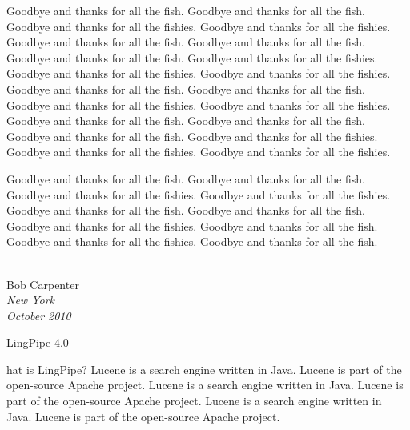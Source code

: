 \documentclass[11pt]{book}
\begin{document}
Goodbye and thanks for all the fish.
Goodbye and thanks for all the fish.
Goodbye and thanks for all the fishies.
Goodbye and thanks for all the fishies.
Goodbye and thanks for all the fish.
Goodbye and thanks for all the fish.
Goodbye and thanks for all the fish.
Goodbye and thanks for all the fishies.
Goodbye and thanks for all the fishies.
Goodbye and thanks for all the fishies.
Goodbye and thanks for all the fish.
Goodbye and thanks for all the fish.
Goodbye and thanks for all the fishies.
Goodbye and thanks for all the fishies.
Goodbye and thanks for all the fish.
Goodbye and thanks for all the fish.
Goodbye and thanks for all the fish.
Goodbye and thanks for all the fishies.
Goodbye and thanks for all the fishies.
Goodbye and thanks for all the fishies.

Goodbye and thanks for all the fish.
Goodbye and thanks for all the fish.
Goodbye and thanks for all the fishies.
Goodbye and thanks for all the fishies.
Goodbye and thanks for all the fish.
Goodbye and thanks for all the fish.
Goodbye and thanks for all the fishies.
Goodbye and thanks for all the fish.
Goodbye and thanks for all the fishies.
Goodbye and thanks for all the fish.
\\[0.2in]
\newlength{\sigWidth}
\mbox{ }
\hfill
\parbox{\sigWidth}{
Bob Carpenter
\\[2pt]\small
\it New York
\\
October 2010}



\clearpage
\pagestyle{empty}
\cleardoublepage
\vspace*{2.375in}
\begin{center}
{\hfill {\Huge LingPipe 4.0}}
\end{center}




%
\setcounter{page}{1}%
%
\pagestyle{fancy}%

hat is LingPipe?
Lucene is a search engine written in Java.  Lucene is part of the
open-source Apache project.
Lucene is a search engine written in Java.  Lucene is part of the
open-source Apache project.
Lucene is a search engine written in Java.  Lucene is part of the
open-source Apache project.

\end{document}
